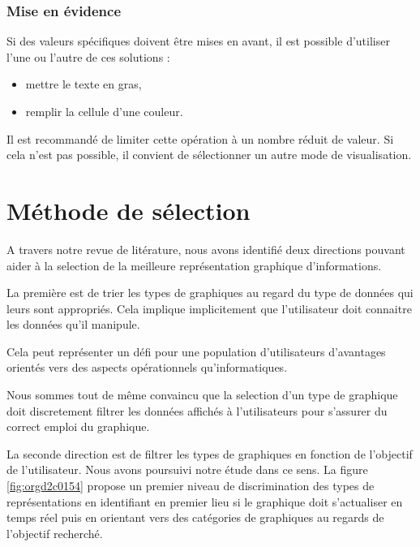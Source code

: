 \documentclass[a4paper,12pt]{article}
\begin{document}
\begin{multicols}{2}
\subsubsection*{Mise en évidence}
\label{sec:orgb5df3ec}
Si des valeurs spécifiques doivent être mises en avant, il est possible d'utiliser l'une ou l'autre de ces solutions :
\begin{itemize}
\item mettre le texte en gras,
\item remplir la cellule d'une couleur.
\end{itemize}
Il est recommandé de limiter cette opération à un nombre réduit de valeur. Si cela n'est pas possible, il convient de sélectionner un autre mode de visualisation.
\section*{Méthode de sélection}
\label{sec:org7a71887}
A travers notre revue de litérature, nous avons identifié deux directions pouvant aider à la selection de la meilleure représentation graphique d'informations.

La première est de trier les types de graphiques au regard du type de données qui leurs sont appropriés. Cela implique implicitement que l'utilisateur doit connaitre les données qu'il manipule.

Cela peut représenter un défi pour une population d'utilisateurs d'avantages orientés vers des aspects opérationnels qu'informatiques.

Nous sommes tout de même convaincu que la selection d'un type de graphique doit discretement filtrer les données affichés à l'utilisateurs pour s'assurer du correct emploi du graphique.

La seconde direction est de filtrer les types de graphiques en fonction de l'objectif de l'utilisateur. Nous avons poursuivi notre étude dans ce sens. La figure \ref{fig:orgd2c0154} propose un premier niveau de discrimination des types de représentations en identifiant en premier lieu si le graphique doit s'actualiser en temps réel puis en orientant vers des catégories de graphiques au regards de l'objectif recherché.


\end{multicols}
\end{document}
